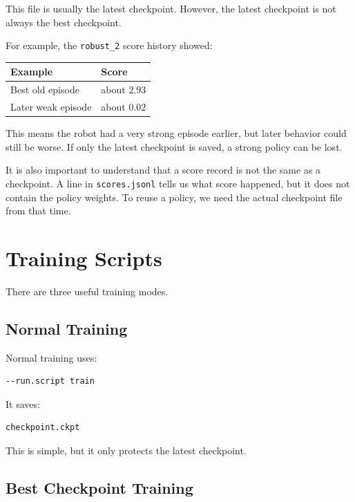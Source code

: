 \documentclass[11pt]{article}
\begin{document}
This file is usually the latest checkpoint. However, the latest checkpoint is not always the best checkpoint.

For example, the \texttt{robust\_2} score history showed:

\begin{center}
\begin{tabular}{ll}
\toprule
Example & Score \\
\midrule
Best old episode & about $2.93$ \\
Later weak episode & about $0.02$ \\
\bottomrule
\end{tabular}
\end{center}

This means the robot had a very strong episode earlier, but later behavior could still be worse. If only the latest checkpoint is saved, a strong policy can be lost.

It is also important to understand that a score record is not the same as a checkpoint. A line in \texttt{scores.jsonl} tells us what score happened, but it does not contain the policy weights. To reuse a policy, we need the actual checkpoint file from that time.

\section{Training Scripts}

There are three useful training modes.

\subsection{Normal Training}

Normal training uses:

\begin{lstlisting}
--run.script train
\end{lstlisting}

It saves:

\begin{lstlisting}
checkpoint.ckpt
\end{lstlisting}

This is simple, but it only protects the latest checkpoint.

\subsection{Best Checkpoint Training}
\end{document}

